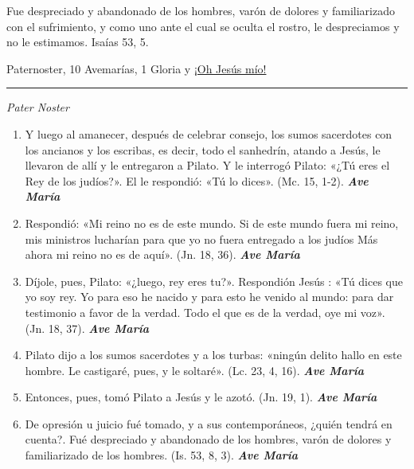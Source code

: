 \documentclass[a4paper,11pt, oneside]{report}
\begin{document}
{{      \smallskip
      Fue despreciado y abandonado de los hombres, varón de dolores y familiarizado con el sufrimiento, y como uno ante el cual
      se oculta el rostro, le despreciamos y no le estimamos. Isaías 53, 5.      
    
       Paternoster, 10 Avemarías, 1 Gloria y \hyperlink{finalFlagelacion}{¡Oh Jesús mío!}

      \medskip

      \begin{center}\rule{1\linewidth}{\linethickness}\end{center}

      \medskip
      \textit{Pater Noster}

      \begin{enumerate}
        
        \item Y luego al amanecer, después de celebrar consejo, los sumos sacerdotes con los ancianos y los escribas, es decir, todo el sanhedrín, atando a Jesús,
        le llevaron de allí y le entregaron a Pilato. Y le interrogó Pilato: «¿Tú eres el Rey de los judíos?». El le respondió: «Tú lo dices». 
        (Mc. 15, 1-2). \textbf{\textit{Ave María}}

        \item Respondió: «Mi reino no es de este mundo. Si de este mundo fuera mi reino, mis ministros lucharían para que yo no fuera entregado a los judíos
        Más ahora mi reino no es de aquí». (Jn. 18, 36). \textbf{\textit{Ave María}}

        \item Díjole, pues, Pilato: «¿luego, rey eres tu?». Respondión Jesús : «Tú dices que yo soy rey. Yo para eso he nacido y para esto he venido
        al mundo: para dar testimonio a favor de la verdad. Todo el que es de la verdad, oye mi voz». (Jn. 18, 37). \textbf{\textit{Ave María}}

        \item Pilato dijo a los sumos sacerdotes y a los turbas: «ningún delito hallo en este hombre. 
        Le castigaré, pues, y le soltaré». (Lc. 23, 4, 16). \textbf{\textit{Ave María}}

        \item Entonces, pues, tomó Pilato a Jesús y le azotó. (Jn. 19, 1). \textbf{\textit{Ave María}}

        \item De opresión u juicio fué tomado, y a sus contemporáneos, ¿quién tendrá en cuenta?. Fué despreciado y abandonado de los hombres,
        varón de dolores y familiarizado de los hombres. (Is. 53, 8, 3). \textbf{\textit{Ave María}}


\end{enumerate}}}
\end{document}
